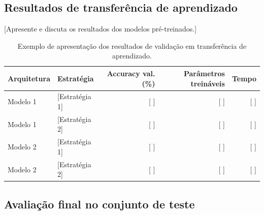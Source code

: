 \documentclass[10pt,a4paper]{article}
\begin{document}

\subsection{Resultados de transferência de aprendizado}

[Apresente e discuta os resultados dos modelos pré-treinados.]

\begin{table}[H]
\centering
\caption{Exemplo de apresentação dos resultados de validação em transferência de aprendizado.}
\label{tab:transfer}
\small
\begin{tabular}{llrrr}
\toprule
Arquitetura & Estratégia & Accuracy val. (\%) & Parâmetros treináveis & Tempo\\
\midrule
Modelo 1 & [Estratégia 1] & [ ] & [ ] & [ ]\\
Modelo 1 & [Estratégia 2] & [ ] & [ ] & [ ]\\
Modelo 2 & [Estratégia 1] & [ ] & [ ] & [ ]\\
Modelo 2 & [Estratégia 2] & [ ] & [ ] & [ ]\\
\bottomrule
\end{tabular}
\end{table}

\subsection{Avaliação final no conjunto de teste}
\end{document}

